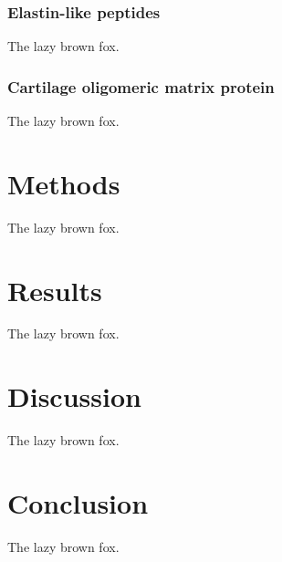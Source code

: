\begin{refsection}
\subsubsection{Elastin-like peptides}
The lazy brown fox.

\subsubsection{Cartilage oligomeric matrix protein}
The lazy brown fox.

\section{Methods}
The lazy brown fox.

\section{Results}
The lazy brown fox.

\section{Discussion}
The lazy brown fox.

\section{Conclusion}
The lazy brown fox.

\printbibliography[heading=subbibliography]

\end{refsection}
